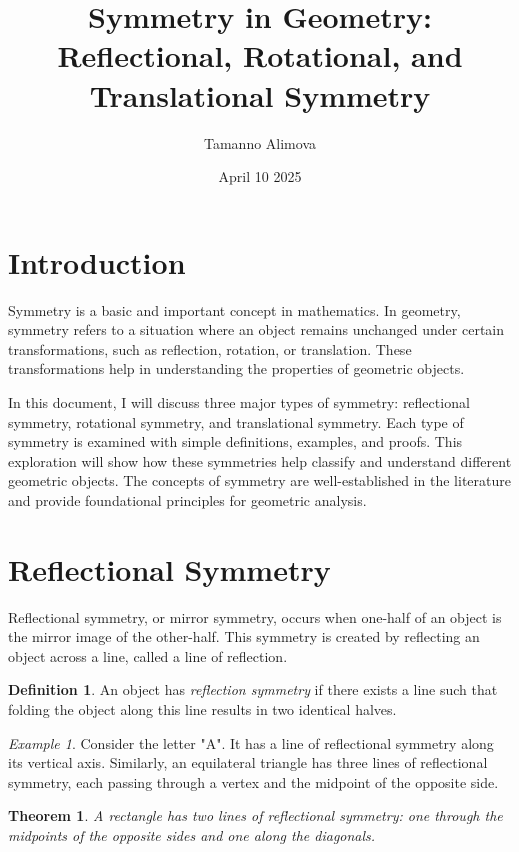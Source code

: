 \documentclass{article}
\title{Symmetry in Geometry: Reflectional, Rotational, and Translational Symmetry}
\author{Tamanno Alimova}
\date{April 10 2025}
\theoremstyle{plain}
\newtheorem{theorem}{Theorem}
\theoremstyle{definition}
\newtheorem{definition}{Definition}
\theoremstyle{remark}
\newtheorem{example}{Example}
\begin{document}
\maketitle

\section{Introduction}
Symmetry is a basic and important concept in mathematics. In geometry, symmetry refers to a situation where an object remains unchanged under certain transformations, such as reflection, rotation, or translation. These transformations help in understanding the properties of geometric objects.

In this document, I will discuss three major types of symmetry: reflectional symmetry, rotational symmetry, and translational symmetry. Each type of symmetry is examined with simple definitions, examples, and proofs. This exploration will show how these symmetries help classify and understand different geometric objects. The concepts of symmetry are well-established in the literature \cite{Greenberg2008} and provide foundational principles for geometric analysis.

\section{Reflectional Symmetry}
Reflectional symmetry, or mirror symmetry, occurs when one-half of an object is the mirror image of the other-half. This symmetry is created by reflecting an object across a line, called a line of reflection.

\begin{definition}\label{def:reflectional}
An object has \textit{ reflection symmetry} if there exists a line such that folding the object along this line results in two identical halves.
\end{definition}

\begin{example}
Consider the letter "A". It has a line of reflectional symmetry along its vertical axis. Similarly, an equilateral triangle has three lines of reflectional symmetry, each passing through a vertex and the midpoint of the opposite side.
\end{example}

\begin{theorem}\label{thm:rectangle}
A rectangle has two lines of reflectional symmetry: one through the midpoints of the opposite sides and one along the diagonals.
\end{theorem}
\end{document}
